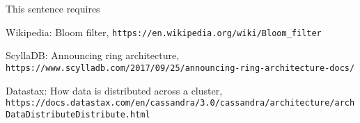 \documentclass[10pt, a4paper, twocolumn]{article} %
\begin{document}
This sentence requires

\begin{thebibliography}{9}
	Wikipedia: Bloom filter,
	\texttt{https://en.wikipedia.org/wiki/Bloom\_filter}

	ScyllaDB: Announcing ring architecture,
	\texttt{https://www.scylladb.com/2017/09/25/announcing-ring-architecture-docs/}

	Datastax: How data is distributed across a cluster,
	\texttt{https://docs.datastax.com/en/cassandra/3.0/cassandra/architecture/archDataDistributeDistribute.html}
\end{thebibliography}
\end{document}
